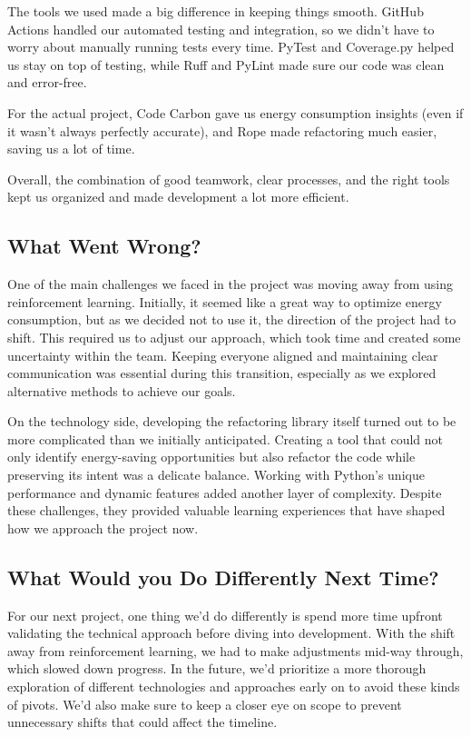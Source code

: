 \documentclass{article}
\begin{document}
The tools we used made a big difference in keeping things smooth. GitHub Actions handled 
our automated testing and integration, so we didn’t have to worry about manually running 
tests every time. PyTest and Coverage.py helped us stay on top of testing, while Ruff and 
PyLint made sure our code was clean and error-free.

For the actual project, Code Carbon gave us energy consumption insights (even if it 
wasn’t always perfectly accurate), and Rope made refactoring much easier, saving us a lot of time.

Overall, the combination of good teamwork, clear processes, and the right tools kept us 
organized and made development a lot more efficient.

\subsection{What Went Wrong?}


One of the main challenges we faced in the project was moving away from using 
reinforcement learning. Initially, it seemed like a great way to optimize energy 
consumption, but as we decided not to use it, the direction of the project had to 
shift. This required us to adjust our approach, which took time and created some 
uncertainty within the team. Keeping everyone aligned and maintaining clear 
communication was essential during this transition, especially as we explored 
alternative methods to achieve our goals.

On the technology side, developing the refactoring library itself turned out to 
be more complicated than we initially anticipated. Creating a tool that could not 
only identify energy-saving opportunities but also refactor the code while preserving 
its intent was a delicate balance. Working with Python's unique performance and 
dynamic features added another layer of complexity. Despite these challenges, they 
provided valuable learning experiences that have shaped how we approach the project now.

\subsection{What Would you Do Differently Next Time?}


For our next project, one thing we’d do differently is spend more time upfront 
validating the technical approach before diving into development. With the shift 
away from reinforcement learning, we had to make adjustments mid-way through, which 
slowed down progress. In the future, we’d prioritize a more thorough exploration of 
different technologies and approaches early on to avoid these kinds of pivots. We’d 
also make sure to keep a closer eye on scope to prevent unnecessary shifts that could 
affect the timeline.
\end{document}

